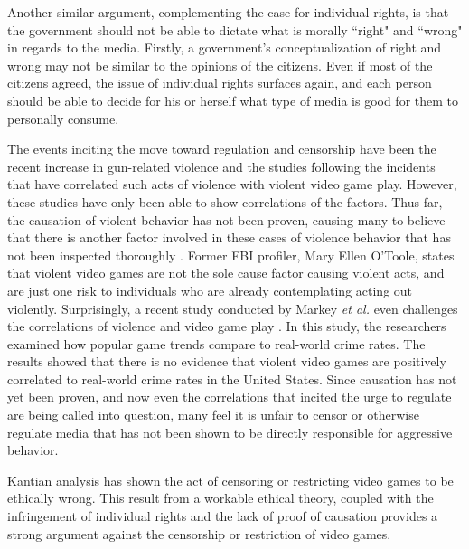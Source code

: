 Another similar argument, complementing the case for individual rights, is that the government should not be able to dictate what is morally ``right" and ``wrong" in regards to the media. Firstly, a government's conceptualization of right and wrong may not be similar to the opinions of the citizens. Even if most of the citizens agreed, the issue of individual rights surfaces again, and each person should be able to decide for his or herself what type of media is good for them to personally consume.

The events inciting the move toward regulation and censorship have been the recent increase in gun-related violence and the studies following the incidents that have correlated such acts of violence with violent video game play. However, these studies have only been able to show correlations of the factors. Thus far, the causation of violent behavior has not been proven, causing many to believe that there is another factor involved in these cases of violence behavior that has not been inspected thoroughly \cite{ferguson2013, ferguson2008}. Former FBI profiler, Mary Ellen O'Toole, states that violent video games are not the sole cause factor causing violent acts, and are just one risk to individuals who are already contemplating acting out violently\cite{makuch2013}. Surprisingly, a recent study conducted by Markey \textit{et al.} even challenges the correlations of violence and video game play \cite{markey2014}. In this study, the researchers examined how popular game trends compare to real-world crime rates. The results showed that there is no evidence that violent video games are positively correlated to real-world crime rates in the United States. Since causation has not yet been proven, and now even the correlations that incited the urge to regulate are being called into question, many feel it is unfair to censor or otherwise regulate media that has not been shown to be directly responsible for aggressive behavior. 

Kantian analysis has shown the act of censoring or restricting video games to be ethically wrong. This result from a workable ethical theory, coupled with the infringement of individual rights and the lack of proof of causation provides a strong argument against the censorship or restriction of video games.


